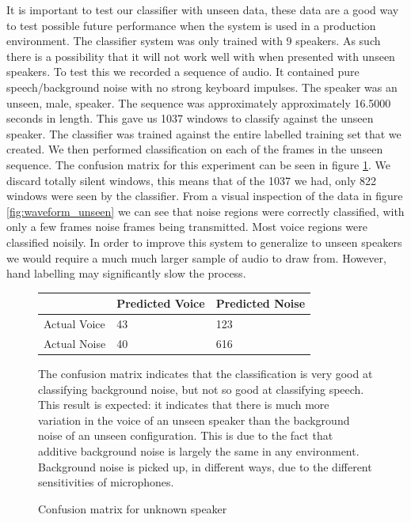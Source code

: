 \documentclass[ %
                    author={Sam Phippen},
                supervisor={Dr. Rafal Bogacz},
                     title={Real time voice activity detectors in noisy personal computing environments},
                  subtitle={},
                    degree={MEng},
                      year={2012} ]{thesis}
\begin{document}
It is important to test our classifier with unseen data, these data are a good
way to test possible future performance when the system is used in a production
environment. The classifier system was only trained with 9 speakers. As such
there is a possibility that it will not work well with when presented with
unseen speakers. To test this we recorded a sequence of audio. It contained
pure speech/background noise with no strong keyboard impulses. The speaker was
an unseen, male, speaker. The sequence was approximately approximately 16.5000
seconds in length. This gave us 1037 windows to classify against the unseen
speaker. The classifier was trained against the entire labelled training set
that we created. We then performed classification on each of the frames in the
unseen sequence. The confusion matrix for this experiment can be seen in figure
\ref{table:confusion_unseen}. We discard totally silent windows, this means
that of the 1037 we had, only 822 windows were seen by the classifier. From a
visual inspection of the data in figure \ref{fig:waveform_unseen} we can see
that noise regions were correctly classified, with only a few frames noise
frames being transmitted. Most voice regions were classified noisily. In order
to improve this system to generalize to unseen speakers we would require a much
much larger sample of audio to draw from. However, hand labelling may
significantly slow the process.


\begin{figure}
    \begin{center}
        \begin{tabular}{| l | l | l |}
            \hline
            & Predicted Voice & Predicted Noise \\ \hline
            Actual Voice & 43 & 123 \\
            Actual Noise & 40 & 616 \\ \hline
        \end{tabular}
    \end{center}
    \vspace{\baselineskip}

    The confusion matrix indicates that the classification is very good at
    classifying background noise, but not so good at classifying speech. This
    result is expected: it indicates that there is much more variation in the
    voice of an unseen speaker than the background noise of an unseen
    configuration. This is due to the fact that additive background noise is
    largely the same in any environment. Background noise is picked up, in
    different ways, due to the different sensitivities of microphones.

    \caption{Confusion matrix for unknown speaker}
    \label{table:confusion_unseen}
\end{figure}
\end{document}
